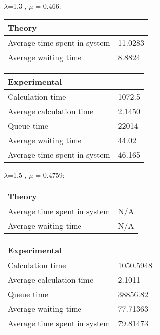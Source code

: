 \begin{minipage}{\linewidth}
   $\lambda$=1.3 , $\mu$ = 0.466:

    \bigskip
    \begin{minipage}{0.45\linewidth}
        \begin{tabular}{|l|l|}
            \hline
            Theory & \\
            \hline
            Average time spent in system & 11.0283 \\
            Average waiting time & 8.8824 \\
            \hline
        \end{tabular}
    \end{minipage}
    \begin{minipage}{0.45\linewidth}
        \begin{tabular}{|l|l|}
            \hline
            Experimental & \\
            \hline
            Calculation time & 1072.5 \\
            Average calculation time & 2.1450 \\
            Queue time & 22014 \\
            Average waiting time & 44.02 \\
            Average time spent in system & 46.165 \\
            \hline
        \end{tabular}
    \end{minipage}
    \bigskip
\end{minipage}

\begin{minipage}{\linewidth}
   $\lambda$=1.5 , $\mu$ = 0.4759:

    \bigskip
    \begin{minipage}{0.45\linewidth}
        \begin{tabular}{|l|l|}
            \hline
            Theory & \\
            \hline
            Average time spent in system & N/A \\
            Average waiting time & N/A \\
            \hline
        \end{tabular}
    \end{minipage}
    \begin{minipage}{0.45\linewidth}
        \begin{tabular}{|l|l|}
            \hline
            Experimental & \\
            \hline
            Calculation time & 1050.5948 \\
            Average calculation time & 2.1011 \\
            Queue time & 38856.82 \\
            Average waiting time & 77.71363 \\
            Average time spent in system & 79.81473 \\
            \hline
        \end{tabular}
    \end{minipage}
    \bigskip
\end{minipage}
